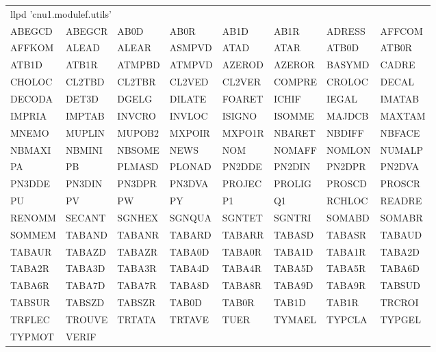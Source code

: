 {\tiny\ttfamily
\noindent\begin{tabular}{@{}llllllll@{}}
\multicolumn{8}{l}{llpd 'cnu1.modulef.utils'}\\
ABEGCD & ABEGCR & AB0D & AB0R & AB1D & AB1R & ADRESS & AFFCOM\\
AFFKOM & ALEAD & ALEAR & ASMPVD & ATAD & ATAR & ATB0D & ATB0R\\
ATB1D & ATB1R & ATMPBD & ATMPVD & AZEROD & AZEROR & BASYMD & CADRE\\
CHOLOC & CL2TBD & CL2TBR & CL2VED & CL2VER & COMPRE & CROLOC & DECAL\\
DECODA & DET3D & DGELG & DILATE & FOARET & ICHIF & IEGAL & IMATAB\\
IMPRIA & IMPTAB & INVCRO & INVLOC & ISIGNO & ISOMME & MAJDCB & MAXTAM\\
MNEMO & MUPLIN & MUPOB2 & MXPOIR & MXPO1R & NBARET & NBDIFF & NBFACE\\
NBMAXI & NBMINI & NBSOME & NEWS & NOM & NOMAFF & NOMLON & NUMALP\\
PA & PB & PLMASD & PLONAD & PN2DDE & PN2DIN & PN2DPR & PN2DVA\\
PN3DDE & PN3DIN & PN3DPR & PN3DVA & PROJEC & PROLIG & PROSCD & PROSCR\\
PU & PV & PW & PY & P1 & Q1 & RCHLOC & READRE\\
RENOMM & SECANT & SGNHEX & SGNQUA & SGNTET & SGNTRI & SOMABD & SOMABR\\
SOMMEM & TABAND & TABANR & TABARD & TABARR & TABASD & TABASR & TABAUD\\
TABAUR & TABAZD & TABAZR & TABA0D & TABA0R & TABA1D & TABA1R & TABA2D\\
TABA2R & TABA3D & TABA3R & TABA4D & TABA4R & TABA5D & TABA5R & TABA6D\\
TABA6R & TABA7D & TABA7R & TABA8D & TABA8R & TABA9D & TABA9R & TABSUD\\
TABSUR & TABSZD & TABSZR & TAB0D & TAB0R & TAB1D & TAB1R & TRCROI\\
TRFLEC & TROUVE & TRTATA & TRTAVE & TUER & TYMAEL & TYPCLA & TYPGEL\\
TYPMOT & VERIF\\ \hline
\end{tabular}}

